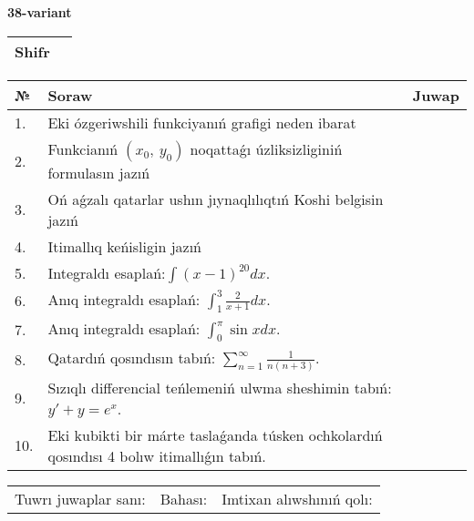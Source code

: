 \documentclass{article}
\begin{document}
  \egroup
  
  \newpage
  
  
  \textbf{38-variant}\\
  
  \bgroup
  \def\arraystretch{1.6} %
  
  \begin{tabular}{|m{5.7cm}|m{9.5cm}|}
  \hline
  Shifr & \\
  \hline
  \end{tabular}
  
  \vspace{1cm}
  
  \begin{tabular}{|m{0.7cm}|m{10cm}|m{4cm}|}
  \hline
  № & Soraw & Juwap \\
  \hline
  1. & Eki ózgeriwshili funkciyanıń grafigi neden ibarat &  \\
  \hline
  2. & Funkcianıń \((x_{0},\ y_{0})\) noqattaǵı úzliksizliginiń formulasın jazıń &  \\
  \hline
  3. & Oń aǵzalı qatarlar ushın jıynaqlılıqtıń Koshi belgisin jazıń &  \\
  \hline
  4. & Itimallıq keńisligin jazıń &  \\
  \hline
  5. & Integraldı esaplań:\(\int{(x - 1)^{20}}dx\). &  \\
  \hline
  6. & Anıq integraldı esaplań: \(\int_{1}^{3}\frac{2}{x + 1}dx\). &  \\
  \hline
  7. & Anıq integraldı esaplań: \(\int_{0}^{\pi}{\sin xdx}\). &  \\
  \hline
  8. & Qatardıń qosındısın tabıń: \(\sum_{n = 1}^{\infty}\frac{1}{n(n + 3)}\). &  \\
  \hline
  9. & Sızıqlı differencial teńlemeniń ulwma sheshimin tabıń: \(y' + y = e^{x}\). &  \\
  \hline
  10. & Eki kubikti bir márte taslaǵanda túsken ochkolardıń qosındısı 4 bolıw itimallıǵın tabıń. &  \\
  \hline
  \end{tabular}
  
  \vspace{1cm}
  
  \begin{tabular}{lll}
  Tuwrı juwaplar sanı: \underline{\hspace{1.5cm}} & 
  Bahası: \underline{\hspace{1.5cm}} & 
  Imtixan alıwshınıń qolı: \underline{\hspace{2cm}} \\
  \end{tabular}
  
\end{document}
